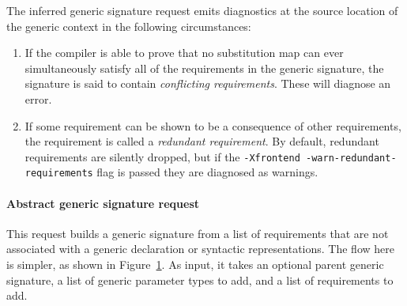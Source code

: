 \documentclass[../generics]{subfiles}
\begin{document}
%
%
%
The inferred generic signature request emits diagnostics at the source location of the generic context in the following circumstances:
\begin{enumerate}
\item If the compiler is able to prove that no substitution map can ever simultaneously satisfy all of the requirements in the generic signature, the signature is said to contain \emph{conflicting requirements}. These will diagnose an error.
\item If some requirement can be shown to be a consequence of other requirements, the requirement is called a \emph{redundant requirement}. By default, redundant requirements are silently dropped, but if the \texttt{-Xfrontend -warn-redundant-requirements} flag is passed they are diagnosed as warnings.
\end{enumerate}

\begin{figure}\label{abstract generic signature request figure}
\begin{center}
\end{center}
\end{figure}

\paragraph{Abstract generic signature request}
%
%
%
This request builds a generic signature from a list of requirements that are not associated with a generic declaration or syntactic representations. The flow here is simpler, as shown in Figure~\ref{abstract generic signature request figure}. As input, it takes an optional parent generic signature, a list of generic parameter types to add, and a list of requirements to add.
\end{document}
